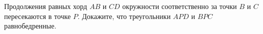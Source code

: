 \begin{ex}
	\begin{condition}
		Продолжения равных хорд \( AB  \) и \( CD  \) окружности соответственно за точки \( B  \) и \( C  \) пересекаются в точке \( P  \). Докажите, что треугольники \( APD  \) и \( BPC  \) равнобедренные.
	\end{condition}
\end{ex}